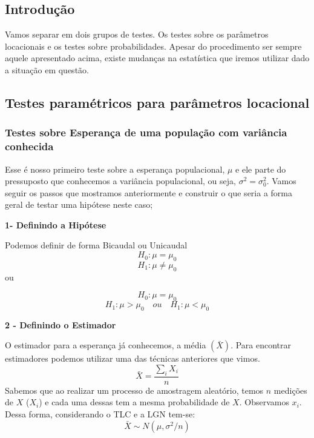 \documentclass[
  letterpaper,
  DIV=11,
  numbers=noendperiod]{scrartcl}
\begin{document}
\subsection{Introdução}\label{introduuxe7uxe3o-3}

Vamos separar em dois grupos de testes. Os testes sobre os parâmetros
locacionais e os testes sobre probabilidades. Apesar do procedimento ser
sempre aquele apresentado acima, existe mudanças na estatística que
iremos utilizar dado a situação em questão.

\subsection{Testes paramétricos para parâmetros
locacional}\label{testes-paramuxe9tricos-para-paruxe2metros-locacional}

\subsubsection{Testes sobre Esperança de uma população com variância
conhecida}\label{testes-sobre-esperanuxe7a-de-uma-populauxe7uxe3o-com-variuxe2ncia-conhecida}

Esse é nosso primeiro teste sobre a esperança populacional, \(\mu\) e
ele parte do pressuposto que conhecemos a variância populacional, ou
seja, \(\sigma^2=\sigma_0^2\). Vamos seguir os passos que mostramos
anteriormente e construir o que seria a forma geral de testar uma
hipótese neste caso;

\vspace{0.5cm}

\textbf{1- Definindo a Hipótese}

Podemos definir de forma Bicaudal ou Unicaudal \[H_0: \mu=\mu_0\]
\[H_1: \mu \neq \mu_0\] ou

\[H_0:  \mu=\mu_0\] \[H_1:  \mu >\mu_0 \quad ou \quad H_1: \mu<\mu_0\]

\vspace{0.5cm}

\textbf{2 - Definindo o Estimador}

O estimador para a esperança já conhecemos, a média \((\bar{X})\). Para
encontrar estimadores podemos utilizar uma das técnicas anteriores que
vimos. \[\bar{X}=\frac{\sum_i{X_i}}{n}\] Sabemos que ao realizar um
processo de amostragem aleatório, temos \(n\) medições de \(X\)
(\(X_i\)) e cada uma dessas tem a mesma probabilidade de \(X\).
Observamos \(x_i\). Dessa forma, considerando o TLC e a LGN tem-se:
\[\bar{X}\sim N(\mu,\sigma^2/n)\]
\end{document}
